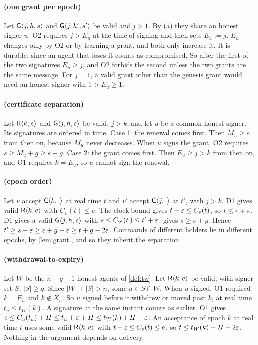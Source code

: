 \paragraph{ (one grant per epoch)}
Let $\mathsf{G}\langle j, h, s\rangle$ and $\mathsf{G}\langle j, h', s'\rangle$ be valid and $j > 1$. By (a) they share an
honest signer $u$. O2 requires $j > E_u$ at the time of signing and then sets $E_u := j$.
$E_u$ changes only by O2 or by learning a grant, and both only increase it. It is durable,
since an agent that loses it counts as compromised. So after the first of the two
signatures $E_u \ge j$, and O2 forbids the second unless the two grants are the same
message. For $j = 1$, a valid grant other than the genesis grant would need an honest
signer with $1 > E_u \ge 1$.

\paragraph{ (certificate separation)}
Let $\mathsf{R}\langle k, e\rangle$ and $\mathsf{G}\langle j, h, s\rangle$ be valid, $j > k$, and let $u$ be a common honest
signer. Its signatures are ordered in time. Case 1: the renewal comes first. Then
$M_u \ge e$ from then on, because $M_u$ never decreases. When $u$ signs the grant, O2
requires $s \ge M_u + g \ge e + g$. Case 2: the grant comes first. Then $E_u \ge j > k$
from then on, and O1 requires $k = E_u$, so $u$ cannot sign the renewal.

\paragraph{ (epoch order)}
Let $v$ accept $\mathsf{C}\langle k, \cdot\rangle$ at real time $t$ and $v'$ accept $\mathsf{C}\langle j, \cdot\rangle$ at
$t'$, with $j > k$. D1 gives valid $\mathsf{R}\langle k, e\rangle$ with $C_v(t) \le e$. The clock bound
gives $t - \varepsilon \le C_v(t)$, so $t \le e + \varepsilon$. D1 gives a valid $\mathsf{G}\langle j, h, s\rangle$ with
$s \le C_{v'}(t') \le t' + \varepsilon$.  gives $s \ge e + g$. Hence
$t' \ge s - \varepsilon \ge e + g - \varepsilon \ge t + g - 2\varepsilon$. Commands of different holders lie in
different epochs, by \cref{lem:grant}, and so they inherit the separation.

\paragraph{ (withdrawal-to-expiry)}
Let $W$ be the $n - q + 1$ honest agents of \cref{def:tw}. Let $\mathsf{R}\langle k, e\rangle$ be valid,
with signer set $S$, $|S| \ge q$. Since $|W| + |S| > n$, some $u \in S \cap W$. When $u$
signed, O1 required $k = E_u$ and $k \notin X_u$. So $u$ signed before it withdrew or
moved past $k$, at real time $t_u \le t_W(k)$. A signature at the same instant counts as
earlier. O1 gives $e \le C_u(t_u) + H \le t_u + \varepsilon + H \le t_W(k) + H + \varepsilon$. An
acceptance of epoch $k$ at real time $t$ uses some valid $\mathsf{R}\langle k, e\rangle$ with
$t - \varepsilon \le C_v(t) \le e$, so $t \le t_W(k) + H + 2\varepsilon$. Nothing in the argument
depends on delivery.


